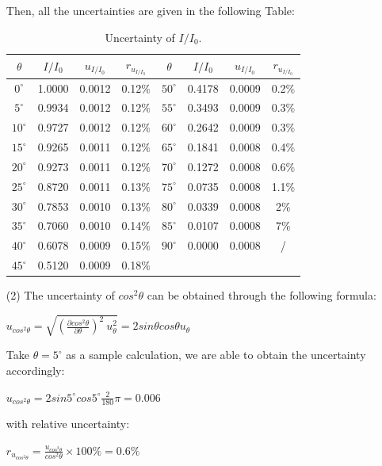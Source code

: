 \documentclass[a4paper,12pt]{article}
\begin{document}
\begin{appendices}
\begin{itemize}
	Then, all the uncertainties are given in the following Table:
	\begin{table}[h]
	\begin{center}
	\begin{tabular}{|c|c|c|c||c|c|c|c|}
	\hline
	$\theta$ & $I / I_0$ & $u_{I / I_0}$ & $r_{u_{I / I_0}}$ & $\theta$ & $I / I_0$ &  $u_{I / 	I_0}$ & $r_{u_{I / 	I_0}}$\\
	\hline
	$0^{\circ}$ & 1.0000 & 0.0012 & 0.12$\%$ & $50^{\circ}$ & 0.4178 & 0.0009 & 0.2$\%$\\
	\hline 
	$5^{\circ}$ & 0.9934 & 0.0012 & 0.12$\%$ & $55^{\circ}$ & 0.3493 & 0.0009 & 0.3$\%$\\
	\hline 
	$10^{\circ}$ & 0.9727 & 0.0012 & 0.12$\%$ & $60^{\circ}$ & 0.2642 & 0.0009 & 0.3$\%$\\
	\hline 
	$15^{\circ}$ & 0.9265 & 0.0011 & 0.12$\%$ & $65^{\circ}$ & 0.1841 & 0.0008 & 0.4$\%$\\
	\hline 
	$20^{\circ}$ & 0.9273 & 0.0011 & 0.12$\%$ & $70^{\circ}$ & 0.1272 & 0.0008 & 0.6$\%$\\
	\hline 
	$25^{\circ}$ & 0.8720 & 0.0011 & 0.13$\%$ & $75^{\circ}$ & 0.0735 & 0.0008 & 1.1$\%$\\
	\hline 
	$30^{\circ}$ & 0.7853 & 0.0010 & 0.13$\%$ & $80^{\circ}$ & 0.0339 & 0.0008 & 2$\%$\\
	\hline 
	$35^{\circ}$ & 0.7060 & 0.0010 & 0.14$\%$ & $85^{\circ}$ & 0.0107 & 0.0008 & 7$\%$\\
	\hline 
	$40^{\circ}$ & 0.6078 & 0.0009 & 0.15$\%$ & $90^{\circ}$ & 0.0000 & 0.0008 & / \\
	\hline 
	$45^{\circ}$ & 0.5120 & 0.0009 & 0.18$\%$ &  &  &  &   \\
	\hline 
	\end{tabular}
	\caption{Uncertainty of $I/I_0$.}
	\end{center}
	\end{table}
	
	\item[(2)] The uncertainty of $cos^2\theta$ can be obtained through the following formula:
	\begin{center}
	$\displaystyle u_{cos^2\theta} = \sqrt{(\frac{\partial cos^2\theta}{\partial \theta})^2 ~ u_{\theta}^2} = 2sin\theta cos\theta u_{\theta}  $
	\end{center}
	Take $\theta = 5^{\circ}$ as a sample calculation, we are able to obtain the uncertainty accordingly:
	\begin{center}
	$\displaystyle u_{cos^2\theta} = 2sin5^{\circ} cos5^{\circ} \frac{2}{180} \pi = 0.006 $
	\end{center}
	with relative uncertainty:
	\begin{center}
	$ \displaystyle r_{u_{cos^2\theta}} =\frac{u_{cos^2\theta}}{cos^2\theta} \times 100\% = 0.6\% $
	\end{center}
	

\end{itemize}
\end{appendices}
\end{document}
